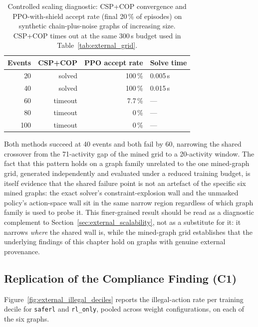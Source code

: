 \begin{table}[H]
\centering
\caption{Controlled scaling diagnostic: CSP+COP convergence and
\ac{PPO}-with-shield accept rate (final 20\,\% of episodes) on synthetic
chain-plus-noise graphs of increasing size. CSP+COP times out at the
same 300\,s budget used in Table~\ref{tab:external_grid}.}
\label{tab:scaling_diagnostic}
{\renewcommand{\arraystretch}{1.5}
\setlength{\tabcolsep}{6pt}
\begin{tabular}{rrrl}
\toprule
\textbf{Events} & \textbf{CSP+COP} & \textbf{PPO accept rate} & \textbf{Solve time} \\
\midrule
20  & solved  & 100\,\%  & 0.005\,s \\
40  & solved  & 100\,\%  & 0.015\,s \\
60  & timeout & 7.7\,\%  & --- \\
80  & timeout & 0\,\%    & --- \\
100 & timeout & 0\,\%    & --- \\
\bottomrule
\end{tabular}}
\end{table}

Both methods succeed at 40 events and both fail by 60, narrowing the
shared crossover from the 71-activity gap of the mined grid to a
20-activity window. The fact that this pattern holds on a graph family
unrelated to the one mined-graph grid, generated independently and
evaluated under a reduced training budget, is itself evidence that the
shared failure point is not an artefact of the specific six mined
graphs: the exact solver's constraint-explosion wall and the unmasked
policy's action-space wall sit in the same narrow region regardless of
which graph family is used to probe it. This finer-grained result should
be read as a diagnostic complement to Section~\ref{sec:external_scalability},
not as a substitute for it: it narrows \emph{where} the shared wall is,
while the mined-graph grid establishes that the underlying findings of
this chapter hold on graphs with genuine external provenance.

\subsection{Replication of the Compliance Finding (C1)}
\label{sec:external_compliance_replication}

Figure~\ref{fig:external_illegal_deciles} reports the illegal-action
rate per training decile for \texttt{saferl} and \texttt{rl\_only},
pooled across weight configurations, on each of the six graphs.

